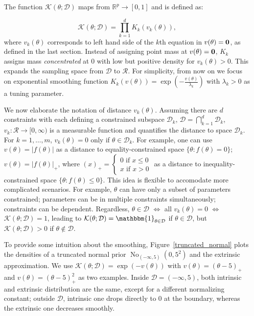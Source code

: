 \documentclass[10pt]{article}
\newcommand{\bb}[1]{\mathbb{#1}}
\newcommand{\mc}[1]{\mathcal{#1}}
\DeclareMathOperator{\No}{No}
\DeclareMathOperator{\1}{\mathbbm{1}}
\begin{document}
The function $\mc K(\theta;\mc D)$ maps from $\bb R^p\rightarrow [0,1]$ and is defined as:

\begin{equation}
\label{smoothing}
\mc K(\theta; \mc D)= \prod_{k=1}^d K_k(v_k(\theta)),
\end{equation}
where $v_k(\theta)$ corresponds to left hand side of the $k$th equation in $v(\theta)=\bf 0$, as defined in the last section. Instead of assigning point mass at $v(\theta)=\bf 0$, $K_k$ assigns mass {\it concentrated} at $0$ with low but positive density for ${v_k(\theta)>0}$. This expands the sampling space from $\mc D$ to $\mc R$. For simplicity, from now on we focus on exponential smoothing function $K_k(v(\theta))=\exp(-\frac{v(\theta)}{\lambda_k})$ with $\lambda_k>0$ as a tuning parameter.

We now elaborate the notation of distance $v_k(\theta)$. Assuming there are $d$ constraints with each defining a constrained subspace $\mc D_k$, $\mc D = \bigcap_{k=1}^d\mc D_k$, $v_k: \mc R \rightarrow [0,\infty)$ is a measurable function and quantifies the distance to space $\mc D_k$. For $k=1,\ldots,m$, $v_k(\theta)=0$ only if $\theta\in \mc D_k$. For example, one can use $v(\theta)=|f(\theta)|$ as a distance to equality-constrained space  $\{\theta:f(\theta)=0\}$; $v(\theta)=|f(\theta)|_+$, where $(x)_+ = \left\{\begin{array}{cc}  0 \text{ if } x\le 0 \\ x \text{ if } x> 0\end{array}\right.$ as a distance to inequality-constrained space  $\{\theta:f(\theta) \le 0\}$. This idea is flexible to accomodate more complicated scenarios. For example, $\theta$ can have only a subset of parameters constrained; parameters can be in multiple constraints simultaneously; constraints can be dependent. Regardless, $\theta\in \mc D$ $\Leftrightarrow$ all $v_k(\theta)=0$ $\Leftrightarrow$ $\mc K(\theta; \mc D)=1$, leading to $\mc K(\theta; \mc D)=\mathbbm{1}_{\theta\in \mc D}$ if $\theta\in \mc D$, but $\mc K(\theta; \mc D)>0$ if  $\theta\not\in \mc D$.

To provide some intuition about the smoothing, Figure~\ref{truncated_normal} plots the densities of a truncated normal prior $\No_{(-\infty,5)}(0,5^2)$ and the extrinsic approximation. We use $\mc K(\theta;\mc D)=\exp(-v(\theta))$ with $v(\theta)=(\theta-5)_+$ and $v(\theta)=(\theta-5)^2_+$ as two examples. Inside $\mc D=(-\infty,5)$, both intrinsic and extrinsic distribution are the same, except for a different normalizing constant; outside $\mc D$, intrinsic one drops directly to $0$ at the boundary, whereas the extrinsic one decreases smoothly.
\end{document}
